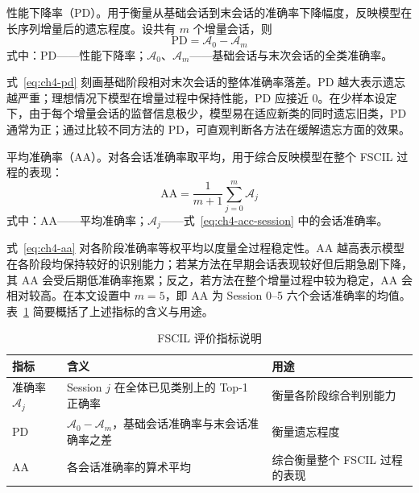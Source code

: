 性能下降率（PD）。用于衡量从基础会话到末会话的准确率下降幅度，反映模型在长序列增量后的遗忘程度。设共有 $m$ 个增量会话，则
\begin{equation}\label{eq:ch4-pd}
  \mathrm{PD} = \mathcal{A}_0 - \mathcal{A}_m
\end{equation}
\noindent 式中：$\mathrm{PD}$——性能下降率；$\mathcal{A}_0$、$\mathcal{A}_m$——基础会话与末次会话的全类准确率。

式~\eqref{eq:ch4-pd} 刻画基础阶段相对末次会话的整体准确率落差。PD 越大表示遗忘越严重；理想情况下模型在增量过程中保持性能，PD 应接近 0。在少样本设定下，由于每个增量会话的监督信息极少，模型易在适应新类的同时遗忘旧类，PD 通常为正；通过比较不同方法的 PD，可直观判断各方法在缓解遗忘方面的效果。

平均准确率（AA）。对各会话准确率取平均，用于综合反映模型在整个 FSCIL 过程的表现：
\begin{equation}\label{eq:ch4-aa}
  \mathrm{AA} = \frac{1}{m+1} \sum_{j=0}^{m} \mathcal{A}_j
\end{equation}
\noindent 式中：$\mathrm{AA}$——平均准确率；$\mathcal{A}_j$——式~\eqref{eq:ch4-acc-session} 中的会话准确率。

式~\eqref{eq:ch4-aa} 对各阶段准确率等权平均以度量全过程稳定性。AA 越高表示模型在各阶段均保持较好的识别能力；若某方法在早期会话表现较好但后期急剧下降，其 AA 会受后期低准确率拖累；反之，若方法在整个增量过程中较为稳定，AA 会相对较高。在本文设置中 $m=5$，即 AA 为 Session 0–5 六个会话准确率的均值。表~\ref{tab:fscil-metrics-desc} 简要概括了上述指标的含义与用途。

\begin{table}[h]
  \caption{FSCIL 评价指标说明}
  \label{tab:fscil-metrics-desc}
  \begingroup
  \renewcommand{\tabularxcolumn}[1]{m{#1}}
  \begin{tabularx}{\textwidth}{>{\hsize=0.70\hsize\centering\arraybackslash}X >{\hsize=1.65\hsize\raggedright\arraybackslash}X >{\hsize=0.65\hsize\raggedright\arraybackslash}X}
  \toprule
  指标 & 含义 & 用途 \\
  \midrule
  准确率 $\mathcal{A}_j$ & Session $j$ 在全体已见类别上的 Top-1 正确率 & 衡量各阶段综合判别能力 \\
  PD & $\mathcal{A}_0 - \mathcal{A}_m$，基础会话准确率与末会话准确率之差 & 衡量遗忘程度 \\
  AA & 各会话准确率的算术平均 & 综合衡量整个 FSCIL 过程的表现 \\
  \bottomrule
  \end{tabularx}
  \endgroup
\end{table}

